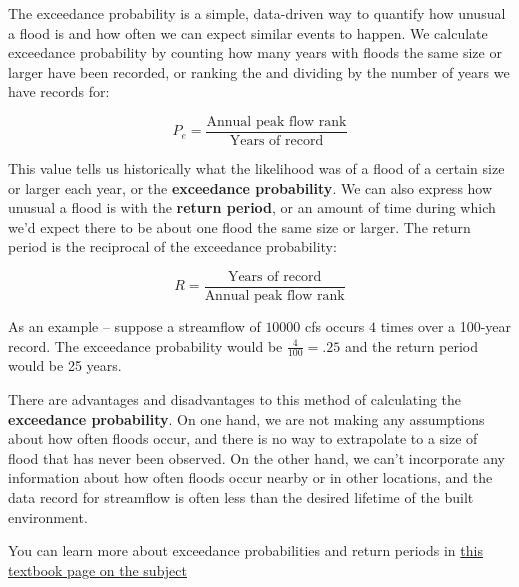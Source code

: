 \documentclass[
  letterpaper,
  DIV=11,
  numbers=noendperiod,
  oneside]{scrreprt}
\begin{document}
The exceedance probability is a simple, data-driven way to quantify how
unusual a flood is and how often we can expect similar events to happen.
We calculate exceedance probability by counting how many years with
floods the same size or larger have been recorded, or ranking the and
dividing by the number of years we have records for:

\[P_e = \frac{\text{Annual peak flow rank}}{\text{Years of record}}\]

This value tells us historically what the likelihood was of a flood of a
certain size or larger each year, or the \textbf{exceedance
probability}. We can also express how unusual a flood is with the
\textbf{return period}, or an amount of time during which we'd expect
there to be about one flood the same size or larger. The return period
is the reciprocal of the exceedance probability:

\[R = \frac{\text{Years of record}}{\text{Annual peak flow rank}}\]

As an example -- suppose a streamflow of \(10000\) cfs occurs \(4\)
times over a 100-year record. The exceedance probability would be
\(\frac{4}{100} = .25\) and the return period would be 25 years.

There are advantages and disadvantages to this method of calculating the
\textbf{exceedance probability}. On one hand, we are not making any
assumptions about how often floods occur, and there is no way to
extrapolate to a size of flood that has never been observed. On the
other hand, we can't incorporate any information about how often floods
occur nearby or in other locations, and the data record for streamflow
is often less than the desired lifetime of the built environment.

\begin{tcolorbox}[enhanced jigsaw, colbacktitle=quarto-callout-color!10!white, opacityback=0, bottomtitle=1mm, toptitle=1mm, bottomrule=.15mm, left=2mm, colframe=quarto-callout-color-frame, leftrule=.75mm, opacitybacktitle=0.6, colback=white, rightrule=.15mm, toprule=.15mm, breakable, titlerule=0mm, title=\textcolor{quarto-callout-color}{\faInfo}\hspace{0.5em}{Read More}, coltitle=black, arc=.35mm]

You can learn more about exceedance probabilities and return periods in
\href{https://www.earthdatascience.org/courses/use-data-open-source-python/use-time-series-data-in-python/floods-return-period-and-probability/}{this
textbook page on the subject}

\end{tcolorbox}
\end{document}
